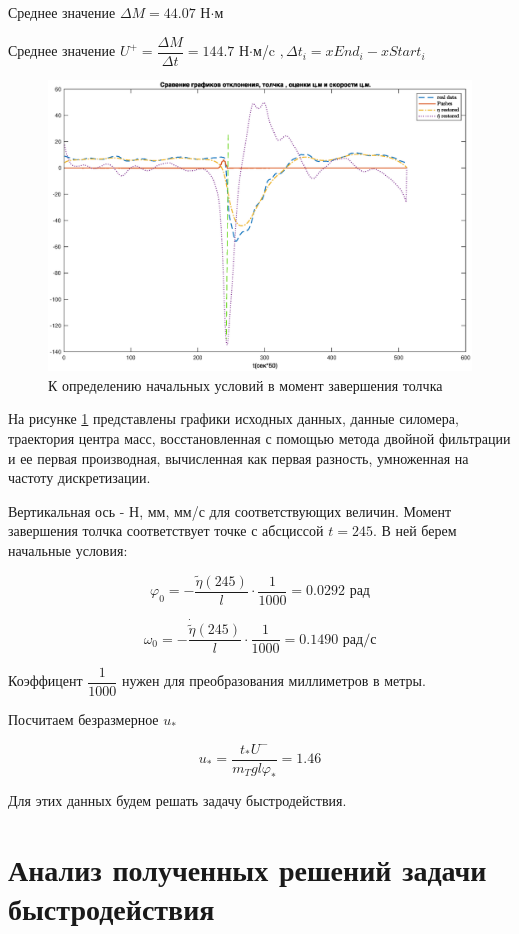 \documentclass[a4paper,12pt, openany]{book}
\theoremstyle{plain} %
\theoremstyle{definition} %
\theoremstyle{remark} %
\numberwithin{equation}{chapter}
\begin{document}
{Среднее значение $\Delta M=44.07$ Н$\cdot$м

Среднее значение $U^+=\dfrac{\Delta M}{\Delta t}=144.7$ Н$\cdot$м/c $,\Delta t_i=xEnd_i-xStart_i$
\begin{figure}[h!]
    \centering
    \includegraphics[width=0.95\linewidth]{all_real.eps}
    \caption{К определению начальных условий в момент завершения толчка}
    \label{all_real}
\end{figure}

На рисунке \ref{all_real} представлены графики исходных данных, данные силомера, траектория центра масс, восстановленная с помощью метода двойной фильтрации и ее первая производная, вычисленная как первая разность, умноженная на частоту дискретизации.

Вертикальная ось - Н, мм, мм/с для соответствующих величин. Момент завершения толчка соответствует точке с абсциссой $t=245$. В ней берем начальные условия:

$$\varphi_0=-\dfrac{\tilde{\eta}(245)}{l}\cdot\dfrac{1}{1000}=0.0292\text{ рад}$$

$$\omega_0=-\dfrac{\dot{\tilde{\eta}}(245)}{l}\cdot\dfrac{1}{1000}=0.1490\text{ рад/с}$$

Коэффицент $\dfrac{1}{1000}$ нужен для преобразования миллиметров в метры.

Посчитаем безразмерное $u_\ast$

\[
    u_\ast=\frac{t_\ast U^-}{m_Tgl\varphi_\ast }=1.46
\]

Для этих данных будем решать задачу быстродействия.

\newpage

\chapter{Анализ полученных решений задачи быстродействия}

}
\end{document}
